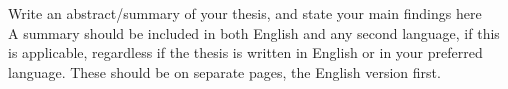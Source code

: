 Write an abstract/summary of your thesis, and state your main findings here\\

\noindent A summary should be included in both English and any second language, if this is applicable, regardless if the thesis is written in English or in your preferred language. These should be on separate pages, the English version first.








